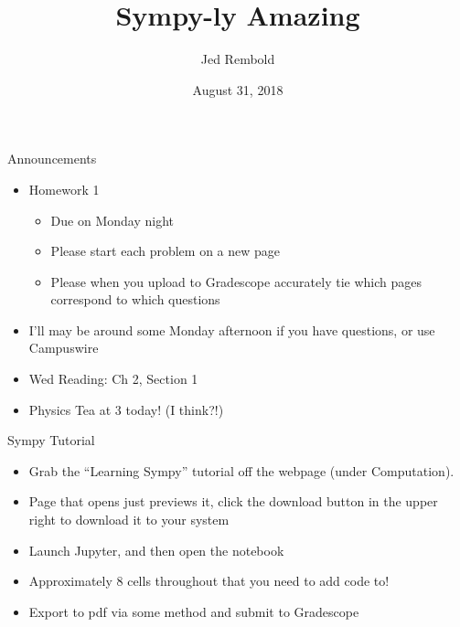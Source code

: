 \documentclass[pdf,aspectratio=169]{beamer}
\title{Sympy-ly Amazing}
\date{August 31, 2018}
\author{Jed Rembold}
\begin{document}
\renewcommand{\theenumi}{\Alph{enumi}}

\begin{frame}{Announcements}
	\begin{itemize}
		\item Homework 1
			\begin{itemize}
				\item Due on Monday night
				\item Please start each problem on a new page
				\item Please when you upload to Gradescope accurately tie which pages correspond to which questions
			\end{itemize}
		\item I'll may be around some Monday afternoon if you have questions, or use Campuswire
		\item Wed Reading: Ch 2, Section 1
		\item Physics Tea at 3 today! (I think?!)
	\end{itemize}
\end{frame}

\begin{frame}{Sympy Tutorial}
	\begin{itemize}
		\item Grab the ``Learning Sympy'' tutorial off the webpage (under Computation).
		\item Page that opens just previews it, click the download button in the upper right to download it to your system
		\item Launch Jupyter, and then open the notebook
		\item Approximately 8 cells throughout that you need to add code to!
		\item Export to pdf via some method and submit to Gradescope
	\end{itemize}
\end{frame}
\end{document}
